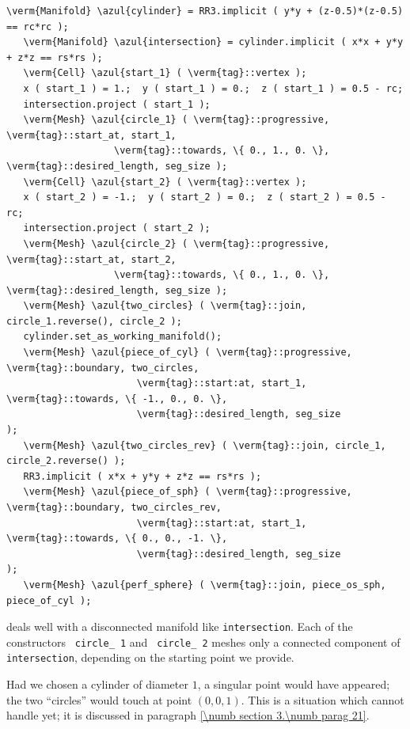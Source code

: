 \begin{Verbatim}[commandchars=\\\{\},formatcom=\small\tt,frame=single,
   label=parag-\ref{\numb section 3.\numb parag 19}.cpp,rulecolor=\color{coment},
   baselinestretch=0.94,framesep=2mm                                            ]
   \verm{Manifold} \azul{cylinder} = RR3.implicit ( y*y + (z-0.5)*(z-0.5) == rc*rc );
   \verm{Manifold} \azul{intersection} = cylinder.implicit ( x*x + y*y + z*z == rs*rs );
   \verm{Cell} \azul{start_1} ( \verm{tag}::vertex );
   x ( start_1 ) = 1.;  y ( start_1 ) = 0.;  z ( start_1 ) = 0.5 - rc;
   intersection.project ( start_1 );
   \verm{Mesh} \azul{circle_1} ( \verm{tag}::progressive, \verm{tag}::start_at, start_1,
                   \verm{tag}::towards, \{ 0., 1., 0. \}, \verm{tag}::desired_length, seg_size );
   \verm{Cell} \azul{start_2} ( \verm{tag}::vertex );
   x ( start_2 ) = -1.;  y ( start_2 ) = 0.;  z ( start_2 ) = 0.5 - rc;
   intersection.project ( start_2 );
   \verm{Mesh} \azul{circle_2} ( \verm{tag}::progressive, \verm{tag}::start_at, start_2,
                   \verm{tag}::towards, \{ 0., 1., 0. \}, \verm{tag}::desired_length, seg_size );
   \verm{Mesh} \azul{two_circles} ( \verm{tag}::join, circle_1.reverse(), circle_2 );
   cylinder.set_as_working_manifold();
   \verm{Mesh} \azul{piece_of_cyl} ( \verm{tag}::progressive, \verm{tag}::boundary, two_circles,
                       \verm{tag}::start:at, start_1, \verm{tag}::towards, \{ -1., 0., 0. \},
                       \verm{tag}::desired_length, seg_size                          );
   \verm{Mesh} \azul{two_circles_rev} ( \verm{tag}::join, circle_1, circle_2.reverse() );
   RR3.implicit ( x*x + y*y + z*z == rs*rs );
   \verm{Mesh} \azul{piece_of_sph} ( \verm{tag}::progressive, \verm{tag}::boundary, two_circles_rev,
                       \verm{tag}::start:at, start_1, \verm{tag}::towards, \{ 0., 0., -1. \},
                       \verm{tag}::desired_length, seg_size                          );
   \verm{Mesh} \azul{perf_sphere} ( \verm{tag}::join, piece_os_sph, piece_of_cyl );
\end{Verbatim}

{\ManiFEM} deals well with a disconnected manifold like {\small\tt intersection}.
Each of the constructors {\small\tt {} circle\_\,1} and {\small\tt {} circle\_\,2} meshes only
a connected component of {\small\tt intersection}, depending on the starting point we provide.

Had we chosen a cylinder of diameter $1$, a singular point would have appeared;
the two ``circles'' would touch at point $ (0,0,1) $.
This is a situation which {\maniFEM} cannot handle yet; it is discussed in paragraph
\ref{\numb section 3.\numb parag 21}.


